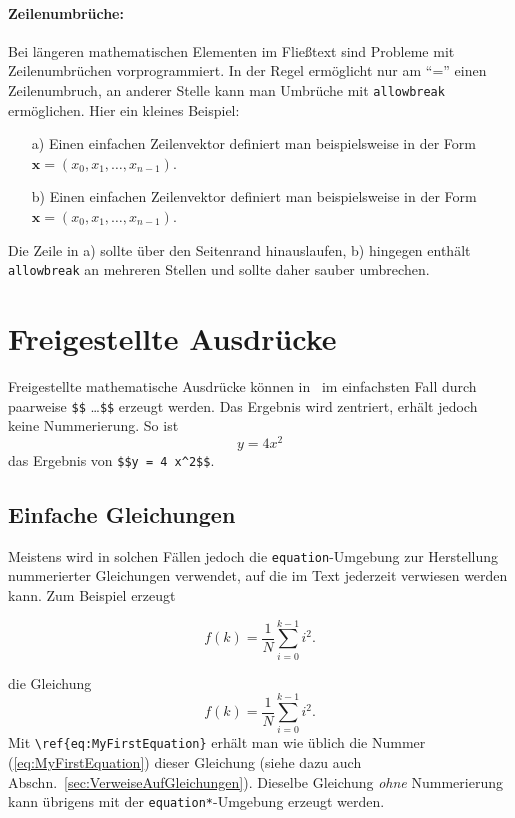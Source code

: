 \paragraph{Zeilenumbrüche:}
Bei längeren mathematischen Elementen im Fließtext sind Probleme mit Zeilenumbrüchen
vorprogrammiert. In der Regel ermöglicht \latex nur am "`="' einen Zeilenumbruch,
an anderer Stelle kann man Umbrüche mit \texttt{{\bs}allowbreak} ermöglichen. 
Hier ein kleines Beispiel:
%
\begin{itemize}
\item[a)] Einen einfachen Zeilenvektor definiert man beispielsweise in der Form 
		$\boldsymbol{x} = (x_0, x_1, \ldots, x_{n-1})$.
\item[b)] Einen einfachen Zeilenvektor definiert man beispielsweise in der Form 
	$\boldsymbol{x} = (x_0,\allowbreak x_1,\allowbreak\ldots,\allowbreak x_{n-1})$.
\end{itemize}
Die Zeile in a) sollte über den Seitenrand hinauslaufen, b) hingegen enthält
\texttt{{\bs}allowbreak} an mehreren Stellen und sollte daher sauber umbrechen.


\section{Freigestellte Ausdrücke}

Freigestellte mathematische Ausdrücke können in \latex\ im einfachsten Fall durch paarweise 
\verb!$$! \ldots \verb!$$! erzeugt werden. Das Ergebnis wird zentriert, erhält jedoch keine 
Nummerierung. So ist \zB\ $$y = 4 x^2$$ das Ergebnis von \verb!$$y = 4 x^2$$!.


\subsection{Einfache Gleichungen} 

Meistens wird in solchen Fällen jedoch die \texttt{equation}-Umgebung zur Herstellung nummerierter 
Gleichungen verwendet, auf die im Text jederzeit verwiesen werden kann. Zum Beispiel erzeugt
%
\begin{LaTeXCode}[numbers=none]
\begin{equation}
  f(k) = \frac{1}{N} \sum_{i=0}^{k-1} i^2 . 
  \label{eq:MyFirstEquation}
\end{equation}
\end{LaTeXCode}
%
die Gleichung
%
\begin{equation}
  f(k) = \frac{1}{N} \sum_{i=0}^{k-1} i^2 . 
\label{eq:MyFirstEquation}
\end{equation}
%
Mit \verb!\ref{eq:MyFirstEquation}! erhält man wie üblich die Nummer (\ref{eq:MyFirstEquation}) dieser Gleichung (siehe dazu auch Abschn.\ \ref{sec:VerweiseAufGleichungen}). 
Dieselbe Gleichung \emph{ohne} Nummerierung kann übrigens mit der \texttt{equation*}-Umgebung erzeugt werden.



